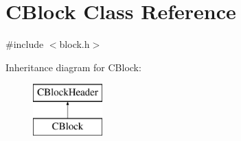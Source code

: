\hypertarget{class_c_block}{}\section{C\+Block Class Reference}
\label{class_c_block}


{\ttfamily \#include $<$block.\+h$>$}

Inheritance diagram for C\+Block\+:\begin{figure}[H]
\begin{center}
\leavevmode
\includegraphics[height=2.000000cm]{class_c_block}
\end{center}
\end{figure}
